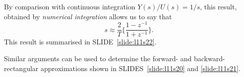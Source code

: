 By comparison with continuous integration $Y(s)/U(s)=1/s$, this result,
obtained by \emph{numerical integration} allows us to say that
$$s \approx \frac{2}{T}\{{\frac{1-z^{-1}}{1+z^{-1}}}\}.$$
This result is summarised in SLIDE~\ref{slide:l11s22}.

Similar arguments can be used to determine the forward- and backward-rectangular
approximations shown in SLIDES~\ref{slide:l11s20} and \ref{slide:l11s21}.
\endinput

